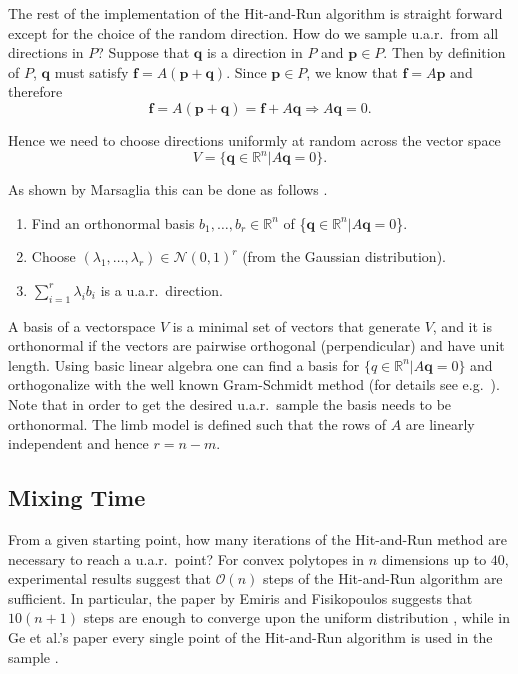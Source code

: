 The rest of the implementation of the Hit-and-Run algorithm is straight forward except for the choice of the random direction. How do we sample u.a.r.\ from all directions in $P$? Suppose that $\textbf{q}$ is a direction in $P$ and $\textbf{p} \in P$. Then by definition of $P$, $\textbf{q}$ must satisfy $\textbf{f} = A(\textbf{p}+\textbf{q})$. Since $\textbf{p} \in P$, we know that $\textbf{f} = A\textbf{p}$ and therefore 
\[\textbf{f} = A(\textbf{p} + \textbf{q}) = \textbf{f} + A\textbf{q} \Rightarrow A\textbf{q} = 0. \]

Hence we need to choose directions uniformly at random across the vector space 
\[V = \{\textbf{q} \in \mathbb{R}^n | A\textbf{q} = 0\}.\]

As shown by Marsaglia this can be done as follows \cite{Marsaglia}.
\begin{enumerate}
\item
Find an orthonormal basis $b_1, \dots, b_r \in \mathbb{R}^{n}$ of \{$\textbf{q} \in \mathbb{R}^n | A\textbf{q} = 0$\}.
\item
Choose $(\lambda_1, \dots, \lambda_r) \in \mathcal{N}(0,1)^r$ (from the Gaussian distribution).
\item
$\sum_{i=1}^r \lambda_i b_i$ is a u.a.r.\ direction.
\end{enumerate}
A basis of a vectorspace $V$ is a minimal set of vectors that generate $V$, and it is orthonormal if the vectors are pairwise orthogonal (perpendicular) and have unit length. Using basic linear algebra one can find a basis for $\{q \in \mathbb{R}^n | A\textbf{q} = 0\}$ and orthogonalize with the well known Gram-Schmidt method (for details see e.g.\ \cite{Robertson}). Note that in order to get the desired u.a.r.\ sample the basis needs to be orthonormal. The limb model is defined such that the rows of $A$ are linearly independent and hence $r=n-m$.

\subsection*{Mixing Time}
\label{sec_lengthrun}
From a given starting point, how many iterations of the Hit-and-Run method are necessary to reach a u.a.r.\ point?
For convex polytopes in $n$ dimensions up to $40$, experimental results suggest that $\mathcal{O}(n)$ steps of the Hit-and-Run algorithm are sufficient.
In particular, the paper \cite{emiris2013efficient} by Emiris and Fisikopoulos suggests that $10(n + 1)$ steps are enough to converge upon the uniform distribution \cite{emiris2013efficient}, while in Ge et al.'s paper every single point of the Hit-and-Run algorithm is used in the sample \cite{Ge}. 

